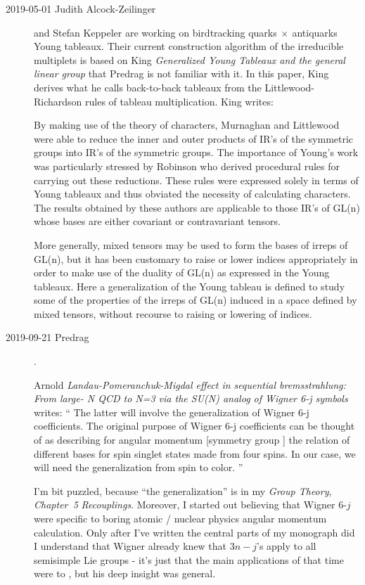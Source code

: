 \begin{description}
\item[2019-05-01 Judith Alcock-Zeilinger] and Stefan Keppeler
are working on birdtracking quarks$~\times~$antiquarks Young tableaux.
Their current construction algorithm of the irreducible multiplets is based on
King {\em Generalized {Young Tableaux} and the general linear group}
that Predrag is not familiar with it. In this paper, King derives what he calls
back-to-back tableaux from the Littlewood-Richardson rules of tableau
multiplication. King writes:

By making use of the theory of characters, Murnaghan and
Littlewood  were able to reduce the inner and outer products of
IR's of the symmetric groups into IR's of the symmetric groups. The importance of
Young's work was particularly stressed by Robinson who derived
procedural rules for carrying out these reductions. These rules were expressed
solely in terms of Young tableaux and thus obviated the necessity of calculating
characters. The results obtained by these authors are applicable to those IR's of
GL(n) whose bases are either covariant or contravariant tensors.

More generally, mixed tensors may be used to form the bases of irreps of GL(n),
but it has been customary to raise or lower indices appropriately in order to
make use of the duality of GL(n) as expressed in the Young tableaux. Here a
generalization of the Young tableau is defined to study some of the properties of
the irreps of GL(n) induced in a space defined by mixed tensors, without recourse
to raising or lowering of indices.

\item[2019-09-21  Predrag].

Arnold {\em {Landau-Pomeranchuk-Migdal} effect in sequential
bremsstrahlung: {From large- N {QCD} to N=3} via the {SU}(N) analog of
{Wigner }6-j symbols} writes:
``
The latter will involve the  generalization of Wigner 6-j
coefficients. The original purpose of Wigner 6-j coefficients can be
thought of as describing for angular momentum [symmetry group ]
the relation of different bases for spin singlet states made from four
spins. In our case, we will need the generalization from spin to color.
''

I'm bit puzzled, because ``the generalization'' is in my \emph{Group
Theory},
 {\em
Chapter~5} {\em Recouplings}. Moreover, I started out believing that
Wigner 6-$j$ were specific to  boring atomic / nuclear physics angular
momentum calculation. Only after I've written the central parts of my
monograph did I understand that Wigner already knew that $3n-j$'s apply
to all semisimple Lie groups - it's just that the main applications of
that time were to , but his deep insight was general.


\end{description}
